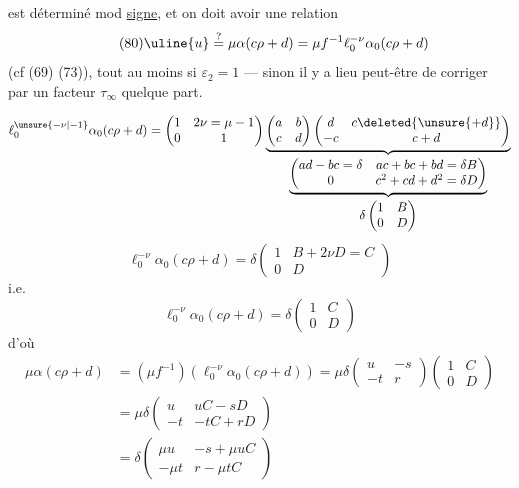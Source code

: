 
est déterminé mod \uline{signe}, et 
on doit avoir une relation
\[
\tag{80}
\uline{u}\overset{?}{=}\mu\alpha(c\rho+d)
=\mu f^{-1}\ell_0^{-\nu}\alpha_0(c\rho+d)
\]
(cf (69) (73)), tout au moins si $\varepsilon_2=1$ ---
sinon il y a lieu peut-être de corriger par un facteur $\tau_\infty$ quelque part.


\[
\ell_0^{\unsure{-\nu|-1}}\alpha_0(c\rho+d)
=
\begin{pmatrix}1&2\nu=\mu-1\\0&1\end{pmatrix}
\underbrace{
\begin{pmatrix}a&b\\c&d\end{pmatrix}
\begin{pmatrix}d&c\deleted{\unsure{+d}}\\-c&c+d\end{pmatrix}
}_{\displaystyle
\underbrace{
\begin{pmatrix}
ad-bc=\delta&ac+bc+bd=\delta B\\
0&c^2+cd+d^2=\delta D
\end{pmatrix}
}_{\displaystyle\delta\begin{pmatrix}1&B\\0&D\end{pmatrix}}
}
\]
\[
\ell_0^{-\nu}\alpha_0(c\rho+d)
=\delta\begin{pmatrix}1&B+2\nu D=C\\0&D\end{pmatrix}
\]
i.e.
\[
\tag{81}
\ell_0^{-\nu}\alpha_0(c\rho+d)
=\delta\begin{pmatrix}1&C\\0&D\end{pmatrix}
\]
d'où
\[
\begin{aligned}
\mu\alpha(c\rho+d)
&=(\mu f^{-1})(\ell_0^{-\nu}\alpha_0(c\rho+d))
=\mu\delta\begin{pmatrix}u&-s\\-t&r\end{pmatrix}
\begin{pmatrix}1&C\\0&D\end{pmatrix}\\
&=\mu\delta\begin{pmatrix}u&uC-sD\\-t&-tC+rD\end{pmatrix}\\
&=\delta\begin{pmatrix}\mu u&-s+\mu uC\\-\mu t&r-\mu tC\end{pmatrix}
\end{aligned}
\]
